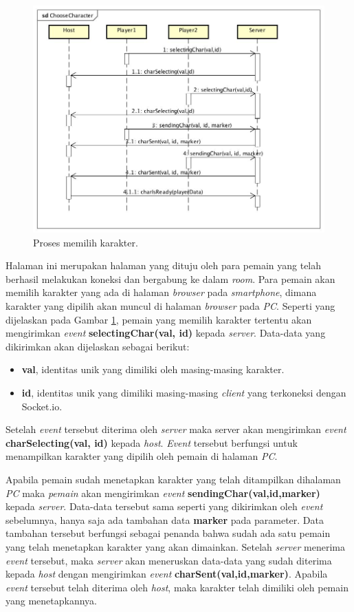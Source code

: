\begin{figure}[H]
	\centering
	\includegraphics[scale=0.38]{Gambar/ChooseCharacter}
	\caption{Proses memilih karakter.}
	\label{fig:2_ChooseCharacter}
\end{figure}

Halaman ini merupakan halaman yang dituju oleh para pemain yang telah berhasil melakukan koneksi dan bergabung ke dalam \textit{room}. Para pemain akan memilih karakter yang ada di halaman \textit{browser} pada \textit{smartphone}, dimana karakter yang dipilih akan muncul di halaman \textit{browser} pada \textit{PC}. Seperti yang dijelaskan pada Gambar \ref{fig:2_ChooseCharacter}, pemain yang memilih karakter tertentu akan mengirimkan \textit{event} \textbf{selectingChar(val, id)} kepada \textit{server}. Data-data yang dikirimkan akan dijelaskan sebagai berikut:
\begin{itemize}
	\item \textbf{val}, identitas unik yang dimiliki oleh masing-masing karakter.
	\item \textbf{id}, identitas unik yang dimiliki masing-masing \textit{client} yang terkoneksi dengan Socket.io.
\end{itemize}
Setelah \textit{event} tersebut diterima oleh \textit{server} maka server akan mengirimkan \textit{event} \textbf{charSelecting(val, id)} kepada \textit{host}. \textit{Event} tersebut berfungsi untuk menampilkan karakter yang dipilih oleh pemain di halaman \textit{PC}.

Apabila pemain sudah menetapkan karakter yang telah ditampilkan dihalaman \textit{PC} maka \textit{pemain} akan mengirimkan \textit{event} \textbf{sendingChar(val,id,marker)} kepada \textit{server}. Data-data tersebut sama seperti yang dikirimkan oleh \textit{event} sebelumnya, hanya saja ada tambahan data \textbf{marker} pada parameter. Data tambahan tersebut berfungsi sebagai penanda bahwa sudah ada satu pemain yang telah menetapkan karakter yang akan dimainkan. Setelah \textit{server} menerima \textit{event} tersebut, maka \textit{server} akan meneruskan data-data yang sudah diterima kepada \textit{host} dengan mengirimkan \textit{event} \textbf{charSent(val,id,marker)}. Apabila \textit{event} tersebut telah diterima oleh \textit{host}, maka karakter telah dimiliki oleh pemain yang menetapkannya.

